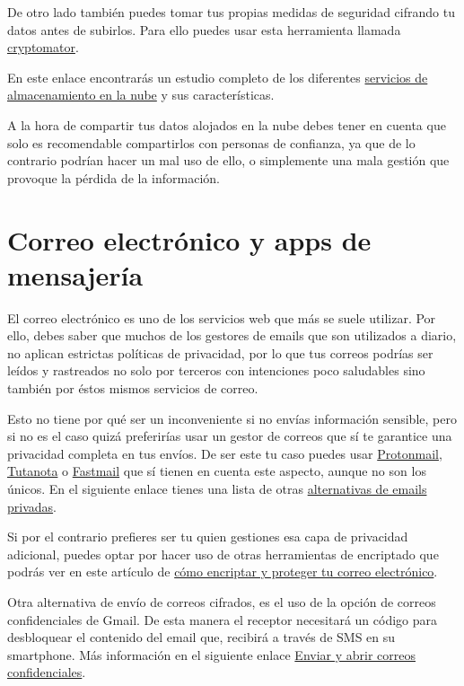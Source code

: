 \documentclass[
  a4paper,
  openany]{book}
\begin{document}
De otro lado también puedes tomar tus propias medidas de seguridad cifrando tu datos antes de subirlos. Para ello puedes usar esta herramienta llamada \href{https://cryptomator.org/}{cryptomator}.

En este enlace encontrarás un estudio completo de los diferentes \href{https://www.osi.es/sites/default/files/docs/osi_servicios_nube.pdf}{servicios de almacenamiento en la nube} y sus características.

A la hora de compartir tus datos alojados en la nube debes tener en cuenta que solo es recomendable compartirlos con personas de confianza, ya que de lo contrario podrían hacer un mal uso de ello, o simplemente una mala gestión que provoque la pérdida de la información.

\hypertarget{correo-electruxf3nico-y-apps-de-mensajeruxeda}{%
\section{Correo electrónico y apps de mensajería}\label{correo-electruxf3nico-y-apps-de-mensajeruxeda}}

El correo electrónico es uno de los servicios web que más se suele utilizar. Por ello, debes saber que muchos de los gestores de emails que son utilizados a diario, no aplican estrictas políticas de privacidad, por lo que tus correos podrías ser leídos y rastreados no solo por terceros con intenciones poco saludables sino también por éstos mismos servicios de correo.

Esto no tiene por qué ser un inconveniente si no envías información sensible, pero si no es el caso quizá preferirías usar un gestor de correos que sí te garantice una privacidad completa en tus envíos. De ser este tu caso puedes usar \href{https://protonmail.com/}{Protonmail}, \href{https://tutanota.com/es/}{Tutanota} o \href{https://www.fastmail.com}{Fastmail} que sí tienen en cuenta este aspecto, aunque no son los únicos. En el siguiente enlace tienes una lista de otras \href{https://blogthinkbig.com/alternativas-gratuitas-gmail-outlook-privacidad}{alternativas de emails privadas}.

Si por el contrario prefieres ser tu quien gestiones esa capa de privacidad adicional, puedes optar por hacer uso de otras herramientas de encriptado que podrás ver en este artículo de \href{https://www.osi.es/es/actualidad/blog/2019/07/31/como-encriptar-y-proteger-tu-correo-electronico}{cómo encriptar y proteger tu correo electrónico}.

Otra alternativa de envío de correos cifrados, es el uso de la opción de correos confidenciales de Gmail. De esta manera el receptor necesitará un código para desbloquear el contenido del email que, recibirá a través de SMS en su smartphone. Más información en el siguiente enlace \href{https://support.google.com/mail/answer/7674059?hl=es\&co=GENIE.Platform\%3DDesktop}{Enviar y abrir correos confidenciales}.
\end{document}
